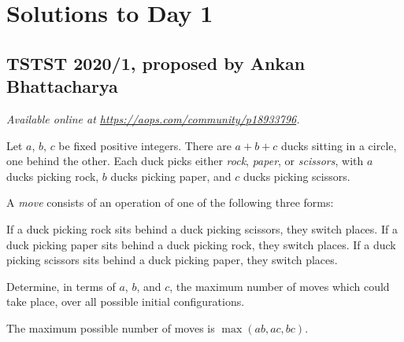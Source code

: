 \documentclass[11pt]{scrartcl}
\begin{document}
\section{Solutions to Day 1}
\subsection{TSTST 2020/1, proposed by Ankan Bhattacharya}
\textsl{Available online at \url{https://aops.com/community/p18933796}.}
\begin{mdframed}[style=mdpurplebox,frametitle={Problem statement}]
Let $a$, $b$, $c$ be fixed positive integers.
There are $a+b+c$ ducks sitting in a circle, one behind the other.
Each duck picks either \emph{rock}, \emph{paper}, or \emph{scissors},
with $a$ ducks picking rock, $b$ ducks picking paper,
and $c$ ducks picking scissors.

A \emph{move} consists of an operation of one of the following three forms:
\begin{itemize}
  \ii If a duck picking rock sits behind a duck
  picking scissors, they switch places.
  \ii If a duck picking paper sits behind a duck
  picking rock, they switch places.
  \ii If a duck picking scissors sits behind a duck
  picking paper, they switch places.
\end{itemize}
Determine, in terms of $a$, $b$, and $c$,
the maximum number of moves which could take place,
over all possible initial configurations.
\end{mdframed}
The maximum possible number of moves is $\max(ab, ac, bc)$.
\end{document}
